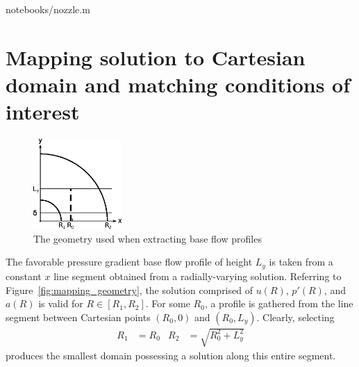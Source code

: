 \documentclass[letterpaper,11pt,nointlimits,reqno]{amsart}
\begin{document}

                {notebooks/nozzle.m}

\clearpage

\section{Mapping solution to Cartesian domain and matching conditions of interest}

\begin{figure}[h]
  \centering
  \includegraphics[width=0.30\textwidth]{nozzle_schematic}
  \caption{
      \label{fig:mapping_geometry}
      The geometry used when extracting base flow profiles
  }
\end{figure}

The favorable pressure gradient base flow profile of height $L_y$ is taken from
a constant $x$ line segment obtained from a radially-varying solution.
Referring to Figure~\eqref{fig:mapping_geometry}, the solution comprised of
$u\!\left(R\right)$, $p'\!\left(R\right)$, and $a\!\left(R\right)$ is valid for
$R\in\left[R_1,R_2\right]$.  For some $R_0$, a profile is gathered from the
line segment between Cartesian points $\left(R_0,0\right)$ and
$\left(R_0,L_y\right)$.  Clearly, selecting
\begin{align}
  R_1 &= R_0
&
  R_2 &= \sqrt{R_0^2 + L_y^2}
\end{align}
produces the smallest domain possessing a solution along this entire segment.
\end{document}
